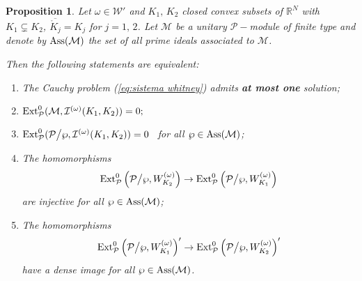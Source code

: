 \documentclass[twoside]{amsart}
\newtheorem{Prop}[Th]{Proposition}
\begin{document}
\begin{Prop}
  Let $\omega\in{\mathcal{W}}'$ and $K_{1},\,K_{2}$ closed convex subsets of ${\mathbb R}^N$ with
  $K_{1}\subsetneq K_{2}$,
  $\overline{\mathring{K}_{j}}=K_{j}$
  for $j=1,\,2$.
  Let
${\mathcal{M}}$ be a unitary ${\mathcal P}-$module of finite
  type and denote by ${\mathop{\rm Ass}\nolimits}({\mathcal{M}})$ the set of all prime ideals
  associated to ${\mathcal{M}}$.

  Then the following statements are equivalent:
\begin{enumerate}
  \item
The Cauchy problem (\ref{eq:sistema whitney}) admits \textbf{at most one}
solution;
\item
${\displaystyle}{\mathop{\rm Ext}\nolimits}_{{\mathcal P}}^{0}({\mathcal{M}},{\mathcal{I}}^{(\omega)}(K_{1},K_{2}))=0;$
\item
${\displaystyle}{\mathop{\rm Ext}\nolimits}_{{\mathcal P}}^{0}({\mathcal P}\bigl/\wp,{\mathcal{I}}^{(\omega)}(K_{1},K_{2}))=0$
~for all $\wp\in{\mathop{\rm Ass}\nolimits}({\mathcal{M}})$;
\item
The homomorphisms
\[
{\mathop{\rm Ext}\nolimits}_{{\mathcal P}}^{0}\left({\mathcal P}\bigl/\wp,W_{K_{2}}^{(\omega)}\right)
\rightarrow{\mathop{\rm Ext}\nolimits}_{{\mathcal P}}^{0}\left({\mathcal P}\bigl/\wp,W_{K_{1}}^{(\omega)}\right)
\]
are injective for all $\wp\in{\mathop{\rm Ass}\nolimits}({\mathcal{M}})$;
\item
The homomorphisms
\[
{\mathop{\rm Ext}\nolimits}_{{\mathcal P}}^{0}\left({\mathcal P}\bigl/\wp,W_{K_{1}}^{(\omega)}\right)'
\rightarrow{\mathop{\rm Ext}\nolimits}_{{\mathcal P}}^{0}\left({\mathcal P}\bigl/\wp,W_{K_{2}}^{(\omega)}
\right)'
\]
have a dense image for all $\wp\in{\mathop{\rm Ass}\nolimits}({\mathcal{M}})$.
\end{enumerate}
\end{Prop}
\end{document}

